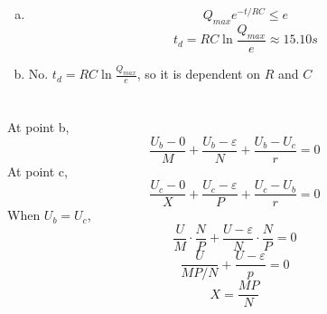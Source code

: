 \documentclass{article}
\begin{document}
\section{}
\begin{enumerate}[(a)]
\item
$$Q_{max}e^{-t/RC}\leqslant e$$
$$t_d=RC\ln\frac{Q_{max}}{e}\approx15.10s$$
\item
No. $t_d=RC\ln\frac{Q_{max}}{e}$, so it is dependent on $R$ and $C$
\end{enumerate}

\section{}
At point b,
$$\frac{U_b-0}{M}+\frac{U_b-\varepsilon}{N}+\frac{U_b-U_c}{r}=0$$
At point c,
$$\frac{U_c-0}{X}+\frac{U_c-\varepsilon}{P}+\frac{U_c-U_b}{r}=0$$
When $U_b=U_c$,
$$\frac{U}{M}\cdot\frac{N}{P}+\frac{U-\varepsilon}{N}\cdot\frac{N}{P}=0$$
$$\frac{U}{MP/N}+\frac{U-\varepsilon}{p}=0$$
$$X=\frac{MP}{N}$$
\end{document}
